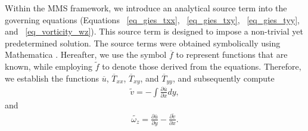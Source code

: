 \documentclass[preprint, 12pt]{elsarticle}
\begin{document}
Within the MMS framework, we introduce an analytical source term into the governing equations (Equations ~\eqref{eq_gies_txx}, ~\eqref{eq_gies_txy}, ~\eqref{eq_gies_tyy}, and ~\eqref{eq_vorticity_wz}). This source term is designed to impose a non-trivial yet predetermined solution. The source terms were obtained symbolically using Mathematica \cite{Mathematica}. Hereafter, we use the symbol $\overline{f}$ to represent functions that are known, while employing $\widetilde{f}$ to denote those derived from the equations. Therefore, we establish the functions $\overline{u}$, $\overline{T}_{xx}$, $\overline{T}_{xy}$, and $\overline{T}_{yy}$, and subsequently compute
\begin{gather}
    \widetilde{v} = - \int \frac{\partial \overline{u}}{\partial x}dy,\label{MMS_v_linha}
\end{gather}
and
\begin{gather}
    \widetilde{\omega_z}=\frac{\partial \overline{u}}{\partial y}-\frac{\partial \widetilde{v}}{\partial x}.\label{vortic_corrent_uv_linha}
\end{gather}
\end{document}
